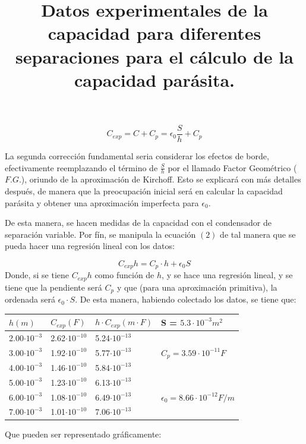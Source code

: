 \documentclass[a4paper,12pt]{article}
\begin{document}
\begin{equation}
    C_{exp} = C + C_p =  \epsilon_0 \frac{S}{h} + C_p 
\end{equation}

La segunda corrección fundamental seria considerar los efectos de borde, efectivamente reemplazando el término de $\frac{S}{h}$ por el llamado Factor Geométrico ($F.G.$), oriundo de la aproximación de Kirchoff. Esto se explicará con más detalles después, de manera que la preocupación inicial será en calcular la capacidad parásita y obtener una aproximación imperfecta para $\epsilon_0$.

De esta manera, se hacen medidas de la capacidad con el condensador de separación variable. Por fín, se manipula la ecuación $(2)$ de tal manera que se pueda hacer una regresión lineal con los datos:

\begin{equation}
C_{exp} h = C_p \cdot h+\epsilon_0 {S}   
\end{equation}
Donde, si se tiene $C_{exp} h$ como función de $h$, y se hace una regresión lineal, y se tiene que la pendiente será $C_p$ y que (para una aproximación primitiva), la ordenada será $\epsilon_0 \cdot S$. De esta manera, habiendo colectado los datos, se tiene que: 

\begin{table}[h!]
    \title{\textbf{Datos experimentales de la capacidad para diferentes separaciones para el cálculo de la capacidad parásita.}}
    \centering
    \begin{tabular}{|l|l|l|l|}
    \hline
    $h(m)$ & $C_{exp}(F)$  & $h\cdot C_{exp}(m\cdot F)$ & S = $5.3 \cdot 10^{-3} m^2$\\
    \hline
    2.00$\cdot 10^{-3}$ & 2.62$\cdot 10^{-10}$ & 5.24$\cdot 10^{-13}$    & \multirow{3}{*}{$C_p = 3.59 \cdot 10^{-11}F$}\\
    \cline{1-3}
    3.00$\cdot 10^{-3}$ &  1.92$\cdot 10^{-10}$ & 5.77$\cdot 10^{-13}$    &\\
    \cline{1-3}
    4.00$\cdot 10^{-3}$ &  1.46$\cdot 10^{-10}$ & 5.84$\cdot 10^{-13}$    &\\
    \hline
    5.00$\cdot 10^{-3}$ &  1.23$\cdot 10^{-10}$ & 6.13$\cdot 10^{-13}$    & \multirow{3}{*}{$\epsilon_0 = 8.66\cdot 10^{-12}F/m$}\\
    \cline{1-3}
    6.00$\cdot 10^{-3}$ &  1.08$\cdot 10^{-10}$ & 6.49$\cdot 10^{-13}$    &\\
    \cline{1-3}
    7.00$\cdot 10^{-3}$ &  1.01$\cdot 10^{-10}$ & 7.06$\cdot 10^{-13}$    &\\
    \hline
\end{tabular}
\end{table}
\pagebreak
Que pueden ser representado gráficamente:
\end{document}
